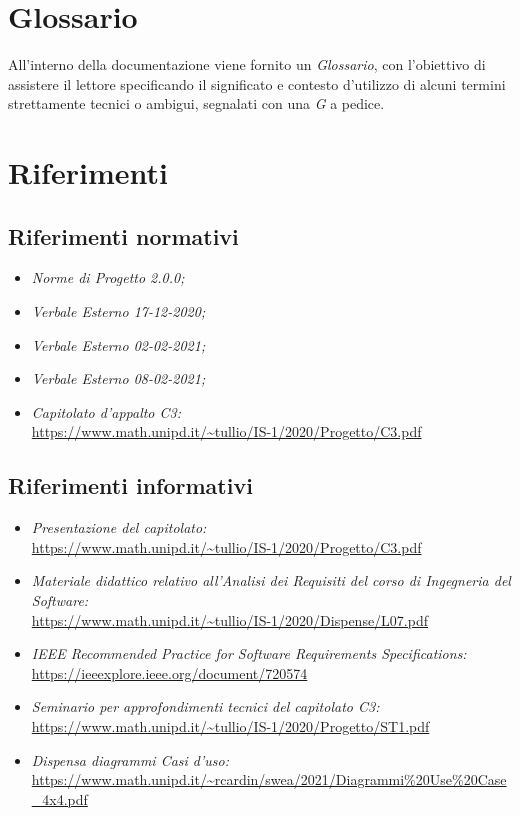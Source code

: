 \section{Glossario}\label{IntroduzioneGlossario}
All'interno della documentazione viene fornito un \textit{Glossario}, con l'obiettivo di assistere il lettore specificando il significato e contesto d'utilizzo di alcuni termini strettamente tecnici o ambigui, segnalati con una \textit{G} a pedice.

\section{Riferimenti}\label{IntroduzioneRiferimenti}
\subsection{Riferimenti normativi}\label{IntroduzioneRiferimentiRiferimentiNormativi}
\begin{itemize}
	\item \textit{Norme di Progetto 2.0.0;}
	\item \textit{Verbale Esterno 17-12-2020;}
	\item \textit{Verbale Esterno 02-02-2021;}
	\item \textit{Verbale Esterno 08-02-2021;}
	\item \textit{Capitolato d'appalto C3:} \\ \url{https://www.math.unipd.it/~tullio/IS-1/2020/Progetto/C3.pdf}
\end{itemize}
\subsection{Riferimenti informativi}\label{IntroduzioneRiferimentiRiferimentiInformativi}
\begin{itemize}
	\item \textit{Presentazione del capitolato:} \\ \url{https://www.math.unipd.it/~tullio/IS-1/2020/Progetto/C3.pdf}
		\item \textit{Materiale didattico relativo all'Analisi dei Requisiti del corso di Ingegneria del Software:}\\ \url{https://www.math.unipd.it/~tullio/IS-1/2020/Dispense/L07.pdf}
	\item \textit{IEEE Recommended Practice for Software Requirements Specifications:}\\
		\url{https://ieeexplore.ieee.org/document/720574}
	\item \textit{Seminario per approfondimenti tecnici del capitolato C3:}\\
		\url{https://www.math.unipd.it/~tullio/IS-1/2020/Progetto/ST1.pdf}
	\item \textit{Dispensa diagrammi Casi d'uso:}\\
		\url{https://www.math.unipd.it/~rcardin/swea/2021/Diagrammi\%20Use\%20Case_4x4.pdf}
\end{itemize}
